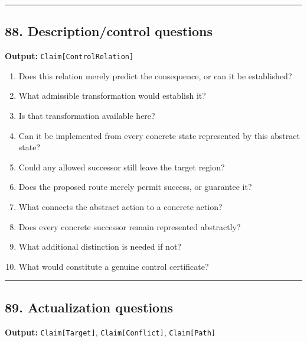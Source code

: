 \documentclass[
]{article}
\providecommand{\tightlist}{%
  \setlength{\itemsep}{0pt}\setlength{\parskip}{0pt}}
\begin{document}
\begin{center}\rule{0.5\linewidth}{0.5pt}\end{center}

\subsection{88. Description/control
questions}\label{descriptioncontrol-questions}

\textbf{Output:} \texttt{Claim{[}ControlRelation{]}}

\begin{enumerate}
\def\labelenumi{\arabic{enumi}.}
\tightlist
\item
  Does this relation merely predict the consequence, or can it be
  established?
\item
  What admissible transformation would establish it?
\item
  Is that transformation available here?
\item
  Can it be implemented from every concrete state represented by this
  abstract state?
\item
  Could any allowed successor still leave the target region?
\item
  Does the proposed route merely permit success, or guarantee it?
\item
  What connects the abstract action to a concrete action?
\item
  Does every concrete successor remain represented abstractly?
\item
  What additional distinction is needed if not?
\item
  What would constitute a genuine control certificate?
\end{enumerate}

\begin{center}\rule{0.5\linewidth}{0.5pt}\end{center}

\subsection{89. Actualization questions}\label{actualization-questions}

\textbf{Output:} \texttt{Claim{[}Target{]}},
\texttt{Claim{[}Conflict{]}}, \texttt{Claim{[}Path{]}}
\end{document}
